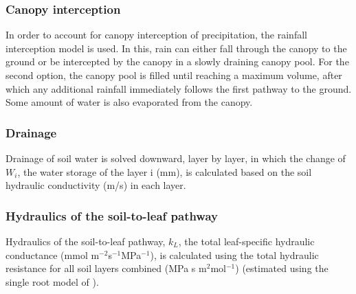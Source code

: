 \documentclass[preprint,12pt,authoryear]{elsarticle}
\begin{document}
\subsubsection{Canopy interception}
In order to account for canopy interception of precipitation, the \cite{Rutter1975} rainfall interception model is used. In this, rain can either fall through the canopy to the ground or be intercepted by the canopy in a slowly draining canopy pool. For the second option, the canopy pool is filled until reaching a maximum volume, after which any additional rainfall immediately follows the first pathway to the ground. Some amount of water is also evaporated from the canopy. 

%


\subsubsection{Drainage}

Drainage of soil water is solved downward, layer by layer, in which the change of $W_{i}$, the water storage of the layer i (mm), is calculated based on the soil hydraulic conductivity (m/s) in each layer.


\subsubsection{Hydraulics of the soil-to-leaf pathway}

Hydraulics of the soil-to-leaf pathway, $k_{L}$, the total leaf-specific hydraulic conductance (mmol m$^{-2}$s$^{-1}$MPa$^{-1}$), is calculated using the total hydraulic resistance for all soil layers combined (MPa s m$^{2}$mol$^{-1}$) (estimated using the single root model of \cite{Gardner1960}).
\end{document}
